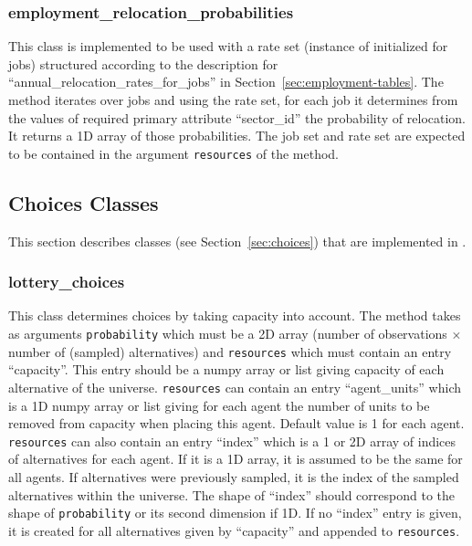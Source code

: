 \subsubsection{employment_relocation_probabilities}
%
This class is implemented to be used with a rate set (instance of
 initialized for jobs) structured according to the description
for ``annual_relocation_rates_for_jobs'' in
Section~\ref{sec:employment-tables}. The  method iterates over
jobs and using the rate set, for each job it determines from the values of
required primary attribute \primaryattributesindex ``sector_id'' the probability of relocation. It
returns a 1D array of those probabilities. The job set and rate set are
expected to be contained in the argument \verb|resources| of the
 method.

%
\subsection{Choices Classes}
%
\label{sec:urbansim-choices}
This section describes  classes (see
Section~\ref{sec:choices}) that are implemented in .

\subsubsection{lottery_choices}
%
This class determines choices by taking capacity into account. The
 method takes as arguments \verb|probability| which must be a 2D
array (number of observations $\times$ number of (sampled) alternatives) and
\verb|resources| which must contain an entry ``capacity''. This entry should
be a numpy array \numpyindex or list giving capacity of each alternative of the universe.
\verb|resources| can contain an entry ``agent_units'' which is a 1D numpy array \numpyindex
or list giving for each agent the number of units to be removed from capacity
when placing this agent. Default value is 1 for each agent.  \verb|resources|
can also contain an entry ``index'' which is a 1 or 2D array of indices of
alternatives for each agent. If it is a 1D array, it is assumed to be the same
for all agents. If alternatives were previously sampled, it is the index of
the sampled alternatives within the universe. The shape of ``index'' should
correspond to the shape of \verb|probability| or its second dimension if 1D.
If no ``index'' entry is given, it is created for all alternatives given by
``capacity'' and appended to \verb|resources|.

